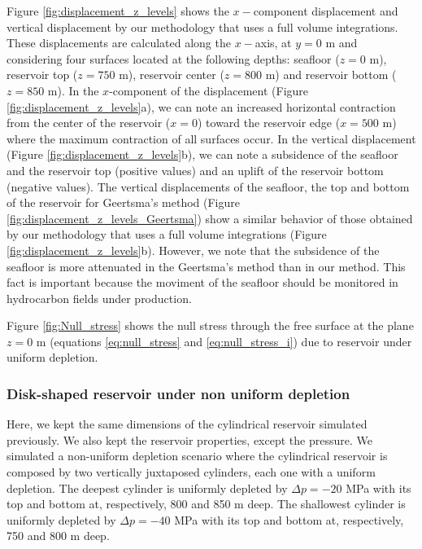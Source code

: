 \documentclass[journal abbreviation, manuscript]{copernicus}
\begin{document}
Figure \ref{fig:displacement_z_levels} shows the $x-$component displacement and vertical displacement by our methodology that uses a full volume integrations.
These displacements are calculated along the $x-$axis, at $y = 0$ m and considering four surfaces located at the following depths:  seafloor ($z = 0$ m), reservoir top ($z = 750$ m), reservoir center ($z = 800$ m) and reservoir bottom ($z = 850$ m).
In the $x$-component of the displacement (Figure \ref{fig:displacement_z_levels}a), we can note an increased horizontal contraction from the center of the reservoir ($x = 0$) toward the reservoir edge ($x= 500$ m) where the maximum contraction of all surfaces occur.
In the vertical displacement (Figure \ref{fig:displacement_z_levels}b), we can note a subsidence of the seafloor and the reservoir top (positive values) and an uplift of the reservoir bottom (negative values).
The vertical displacements of the seafloor, the top and bottom of the reservoir for Geertsma’s method (Figure \ref{fig:displacement_z_levels_Geertsma}) show a similar behavior of those obtained by our methodology that uses a full volume integrations (Figure \ref{fig:displacement_z_levels}b). 
However, we note that the subsidence of the seafloor is more attenuated in the Geertsma’s method than in our method.
This fact is important because the moviment of the seafloor should be monitored in hydrocarbon fields under production.

Figure \ref{fig:Null_stress} shows the  null stress through the free surface at the plane 
$z=0$ m (equations \ref{eq:null_stress} and \ref{eq:null_stress_i}) due to reservoir under uniform depletion.



\subsubsection{Disk-shaped reservoir under non uniform depletion}

Here, we kept the same dimensions of the cylindrical reservoir simulated previously.
We also kept the  reservoir properties, except the pressure.
We simulated a non-uniform depletion scenario where the cylindrical reservoir is composed by two vertically juxtaposed cylinders, each one with a uniform depletion.
The deepest cylinder is uniformly depleted by $\Delta p = -20$ MPa with its top and bottom at, respectively, 800 and 850 m deep.
The shallowest cylinder is uniformly depleted by $\Delta p = -40$ MPa with its top and bottom at, respectively, 750 and 800 m deep.
\end{document}
